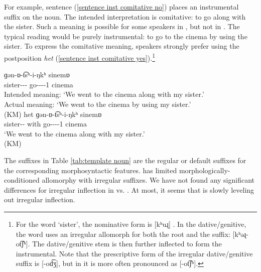 For example, sentence (\ref{sentence inst comitative no}) places an instrumental suffix on the noun. The intended interpretation is comitative: to go along with the sister. Such a meaning is possible for some speakers in {\seaSEA}, but not in {\iaIA}. The typical {\iaIA} reading would be purely instrumental: to go to the cinema by using the sister. To express the comitative meaning, speakers strongly prefer using the postposition \textit{het} (\ref{sentence inst comitative yes}).\footnote{For the word `sister', the nominative form is [{kʰuɻ}] . In the dative/genitive, the word uses an irregular allomorph for both the root and the suffix: [{kʰəɻ-ot͡ʃʰ}]. The dative/genitive stem is then further inflected to form the instrumental. Note that the prescriptive form of the irregular dative/genitive suffix is [{-od͡ʒ}], but in {\iaIA} it is more often pronounced as [{-ot͡ʃʰ}].}\largerpage

\begin{exe}
	\ex 
	\begin{xlist}
		\ex {} {ɡən-ɒ-t͡sʰ-i-ŋkʰ} {sinemɒ} 
		\\
		sister-{\dat}-{\ins}-{\possFsg} go-{\thgloss}-{\aorperf}-{\pst}-1{\pl} cinema
		\\
		\trans 	Intended meaning: `We went to the cinema along with my sister.' \label{sentence inst comitative no}
		\\
		Actual meaning: `We went to the cinema by using my sister.'
		\\
		 \hfill (KM)
		\ex {} {het} {ɡən-ɒ-t͡sʰ-i-ŋkʰ} {sinemɒ}
		\\
		sister-{\gen}-{\possFsg} with go-{\thgloss}-{\aorperf}-{\pst}-1{\pl} cinema
		\\
		\trans 	`We went to the cinema along with my sister.'\label{sentence inst comitative yes}
		\\
		 \hfill (KM)
	\end{xlist}
\end{exe}



The   suffixes in Table \ref{tab:template noun} are the  regular  or default suffixes for the corresponding morphosyntactic features. {\iaIA} has limited     morphologically-conditioned allomorphy with irregular suffixes. We have not found any significant differences for irregular inflection in {\iaIA} vs. {\seaSEA}. At most, it seems that {\iaIA} is slowly leveling out irregular inflection.



